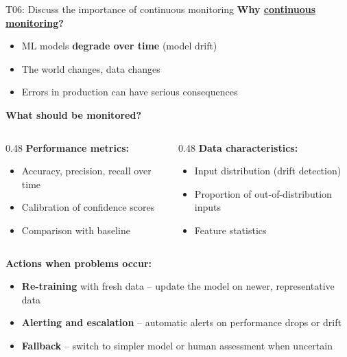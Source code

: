 \documentclass[aspectratio=169, 10pt]{beamer}
\begin{document}
\begin{frame}{T06: Discuss the importance of continuous monitoring}
    \textbf{Why \href{https://en.wikipedia.org/wiki/Continuous_monitoring}{continuous monitoring}?}
    \begin{itemize}
        \item ML models \textbf{degrade over time} (model drift)
        \item The world changes, data changes
        \item Errors in production can have serious consequences
    \end{itemize}
    
    \vspace{0.2cm}
    \textbf{What should be monitored?}
    \begin{columns}[T]
        \begin{column}{0.48\textwidth}
            \textbf{Performance metrics:}
            \begin{itemize}
                \item Accuracy, precision, recall over time
                \item Calibration of confidence scores
                \item Comparison with baseline
            \end{itemize}
        \end{column}
        \begin{column}{0.48\textwidth}
            \textbf{Data characteristics:}
            \begin{itemize}
                \item Input distribution (drift detection)
                \item Proportion of out-of-distribution inputs
                \item Feature statistics
            \end{itemize}
        \end{column}
    \end{columns}
    
    \vspace{0.2cm}
    \textbf{Actions when problems occur:}
    \begin{itemize}
        \item \textbf{Re-training} with fresh data -- update the model on newer, representative data
        \item \textbf{Alerting and escalation} -- automatic alerts on performance drops or drift
        \item \textbf{Fallback} -- switch to simpler model or human assessment when uncertain
    \end{itemize}
\end{frame}
\end{document}

